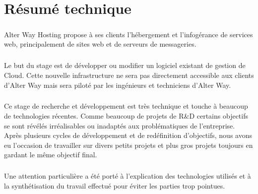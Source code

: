 \chapter*{Résumé technique}
\paragraph*{}
	Alter Way Hosting propose à ses clients l'hébergement et l'infogérance de
	services web, principalement de sites web et de serveurs de messageries.

\paragraph*{}
	Le but du stage est de développer ou modifier un logiciel existant de gestion
	de Cloud. Cette nouvelle infrastructure ne sera pas directement accessible
	aux clients d'Alter Way mais sera piloté par les ingénieurs et techniciens
	d'Alter Way.

\paragraph*{}
	Ce stage de recherche et développement est très technique et touche à beaucoup de technologies récentes.
	Comme beaucoup de projets de R\&D certains objectifs se sont révélés irréalisables ou inadaptés aux problématiques
	de l'entreprise.\\
	Après plusieurs cycles de développement et de redéfinition d'objectifs, nous avons eu l'occasion de travailler
	sur divers petits projets et plus gros projets toujours en gardant le même objectif final.

\paragraph*{}
	Une attention particulière a été porté à l'explication des technologies utilisés et à la synthétisation du
	travail effectué pour éviter les parties trop pointues.

